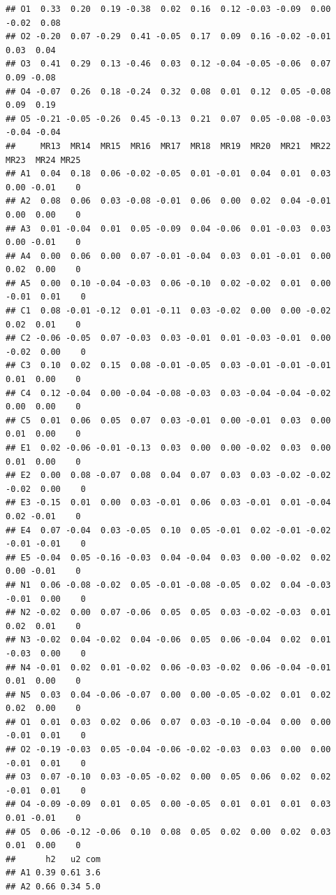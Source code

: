 \documentclass[
]{ctexart}
\begin{document}
\begin{verbatim}
## O1  0.33  0.20  0.19 -0.38  0.02  0.16  0.12 -0.03 -0.09  0.00 -0.02  0.08
## O2 -0.20  0.07 -0.29  0.41 -0.05  0.17  0.09  0.16 -0.02 -0.01  0.03  0.04
## O3  0.41  0.29  0.13 -0.46  0.03  0.12 -0.04 -0.05 -0.06  0.07  0.09 -0.08
## O4 -0.07  0.26  0.18 -0.24  0.32  0.08  0.01  0.12  0.05 -0.08  0.09  0.19
## O5 -0.21 -0.05 -0.26  0.45 -0.13  0.21  0.07  0.05 -0.08 -0.03 -0.04 -0.04
##     MR13  MR14  MR15  MR16  MR17  MR18  MR19  MR20  MR21  MR22  MR23  MR24 MR25
## A1  0.04  0.18  0.06 -0.02 -0.05  0.01 -0.01  0.04  0.01  0.03  0.00 -0.01    0
## A2  0.08  0.06  0.03 -0.08 -0.01  0.06  0.00  0.02  0.04 -0.01  0.00  0.00    0
## A3  0.01 -0.04  0.01  0.05 -0.09  0.04 -0.06  0.01 -0.03  0.03  0.00 -0.01    0
## A4  0.00  0.06  0.00  0.07 -0.01 -0.04  0.03  0.01 -0.01  0.00  0.02  0.00    0
## A5  0.00  0.10 -0.04 -0.03  0.06 -0.10  0.02 -0.02  0.01  0.00 -0.01  0.01    0
## C1  0.08 -0.01 -0.12  0.01 -0.11  0.03 -0.02  0.00  0.00 -0.02  0.02  0.01    0
## C2 -0.06 -0.05  0.07 -0.03  0.03 -0.01  0.01 -0.03 -0.01  0.00 -0.02  0.00    0
## C3  0.10  0.02  0.15  0.08 -0.01 -0.05  0.03 -0.01 -0.01 -0.01  0.01  0.00    0
## C4  0.12 -0.04  0.00 -0.04 -0.08 -0.03  0.03 -0.04 -0.04 -0.02  0.00  0.00    0
## C5  0.01  0.06  0.05  0.07  0.03 -0.01  0.00 -0.01  0.03  0.00  0.01  0.00    0
## E1  0.02 -0.06 -0.01 -0.13  0.03  0.00  0.00 -0.02  0.03  0.00  0.01  0.00    0
## E2  0.00  0.08 -0.07  0.08  0.04  0.07  0.03  0.03 -0.02 -0.02 -0.02  0.00    0
## E3 -0.15  0.01  0.00  0.03 -0.01  0.06  0.03 -0.01  0.01 -0.04  0.02 -0.01    0
## E4  0.07 -0.04  0.03 -0.05  0.10  0.05 -0.01  0.02 -0.01 -0.02 -0.01 -0.01    0
## E5 -0.04  0.05 -0.16 -0.03  0.04 -0.04  0.03  0.00 -0.02  0.02  0.00 -0.01    0
## N1  0.06 -0.08 -0.02  0.05 -0.01 -0.08 -0.05  0.02  0.04 -0.03 -0.01  0.00    0
## N2 -0.02  0.00  0.07 -0.06  0.05  0.05  0.03 -0.02 -0.03  0.01  0.02  0.01    0
## N3 -0.02  0.04 -0.02  0.04 -0.06  0.05  0.06 -0.04  0.02  0.01 -0.03  0.00    0
## N4 -0.01  0.02  0.01 -0.02  0.06 -0.03 -0.02  0.06 -0.04 -0.01  0.01  0.00    0
## N5  0.03  0.04 -0.06 -0.07  0.00  0.00 -0.05 -0.02  0.01  0.02  0.02  0.00    0
## O1  0.01  0.03  0.02  0.06  0.07  0.03 -0.10 -0.04  0.00  0.00 -0.01  0.01    0
## O2 -0.19 -0.03  0.05 -0.04 -0.06 -0.02 -0.03  0.03  0.00  0.00 -0.01  0.01    0
## O3  0.07 -0.10  0.03 -0.05 -0.02  0.00  0.05  0.06  0.02  0.02 -0.01  0.01    0
## O4 -0.09 -0.09  0.01  0.05  0.00 -0.05  0.01  0.01  0.01  0.03  0.01 -0.01    0
## O5  0.06 -0.12 -0.06  0.10  0.08  0.05  0.02  0.00  0.02  0.03  0.01  0.00    0
##      h2   u2 com
## A1 0.39 0.61 3.6
## A2 0.66 0.34 5.0

\end{verbatim}
\end{document}
